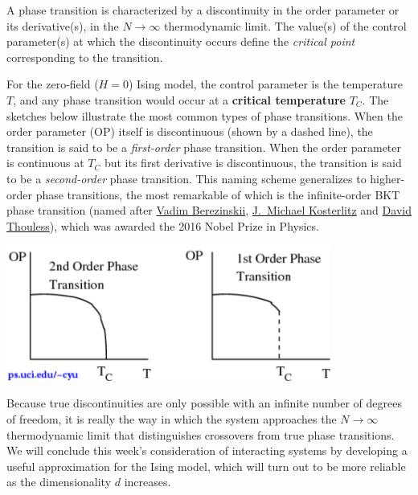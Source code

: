 \begin{shaded}
  A phase transition is characterized by a discontinuity in the order parameter or its derivative(s), in the $N \to \infty$ thermodynamic limit.
  The value(s) of the control parameter(s) at which the discontinuity occurs define the \textit{critical point} corresponding to the transition.
\end{shaded}

For the zero-field ($H = 0$) Ising model, the control parameter is the temperature $T$, and any phase transition would occur at a \textbf{critical temperature} $T_C$.
The sketches below illustrate the most common types of phase transitions.
When the order parameter (OP) itself is discontinuous (shown by a dashed line), the transition is said to be a \textit{first-order} phase transition.
When the order parameter is continuous at $T_C$ but its first derivative is discontinuous, the transition is said to be a \textit{second-order} phase transition.
This naming scheme generalizes to higher-order phase transitions, the most remarkable of which is the infinite-order BKT phase transition (named after \href{https://en.wikipedia.org/wiki/Vadim_Berezinskii}{Vadim Berezinskii}, \href{https://en.wikipedia.org/wiki/J._Michael_Kosterlitz}{J.\ Michael Kosterlitz} and \href{https://en.wikipedia.org/wiki/David_J._Thouless}{David Thouless}), which was awarded the 2016 Nobel Prize in Physics.

\begin{center}\includegraphics[width=0.8\textwidth]{figs/unit09_transitions.pdf}\end{center}

Because true discontinuities are only possible with an infinite number of degrees of freedom, it is really the way in which the system approaches the $N \to \infty$ thermodynamic limit that distinguishes crossovers from true phase transitions.
We will conclude this week's consideration of interacting systems by developing a useful approximation for the Ising model, which will turn out to be more reliable as the dimensionality $d$ increases.



